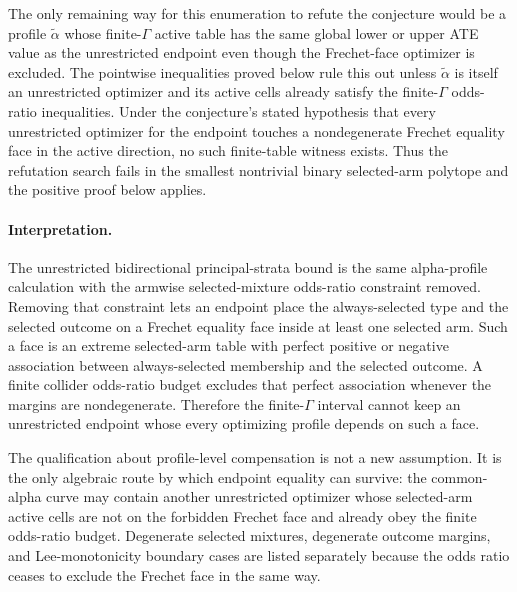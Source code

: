 The only remaining way for this enumeration to refute the conjecture would be a profile \(\tilde\alpha\) whose finite-\(\Gamma\) active table has the same global lower or upper ATE value as the unrestricted endpoint even though the Frechet-face optimizer is excluded.  The pointwise inequalities proved below rule this out unless \(\tilde\alpha\) is itself an unrestricted optimizer and its active cells already satisfy the finite-\(\Gamma\) odds-ratio inequalities.  Under the conjecture's stated hypothesis that every unrestricted optimizer for the endpoint touches a nondegenerate Frechet equality face in the active direction, no such finite-table witness exists.  Thus the refutation search fails in the smallest nontrivial binary selected-arm polytope and the positive proof below applies.

\paragraph{Interpretation.}
The unrestricted bidirectional principal-strata bound is the same alpha-profile calculation with the armwise selected-mixture odds-ratio constraint removed.  Removing that constraint lets an endpoint place the always-selected type and the selected outcome on a Frechet equality face inside at least one selected arm.  Such a face is an extreme selected-arm table with perfect positive or negative association between always-selected membership and the selected outcome.  A finite collider odds-ratio budget excludes that perfect association whenever the margins are nondegenerate.  Therefore the finite-\(\Gamma\) interval cannot keep an unrestricted endpoint whose every optimizing profile depends on such a face.

The qualification about profile-level compensation is not a new assumption.  It is the only algebraic route by which endpoint equality can survive: the common-alpha curve may contain another unrestricted optimizer whose selected-arm active cells are not on the forbidden Frechet face and already obey the finite odds-ratio budget.  Degenerate selected mixtures, degenerate outcome margins, and Lee-monotonicity boundary cases are listed separately because the odds ratio ceases to exclude the Frechet face in the same way.

